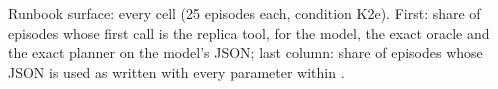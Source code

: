 \begin{table}[!htbp]
\centering
\caption{Runbook surface: every cell (25 episodes each, condition K2e). First: share of episodes whose first call is the replica tool, for the model, the exact oracle and the exact planner on the model's JSON; last column: share of episodes whose JSON is used as written with every parameter within \agStrTol.}
\label{tab:r-cells}
\scriptsize\setlength{\tabcolsep}{3pt}
\resizebox{\linewidth}{!}{}
\end{table}
